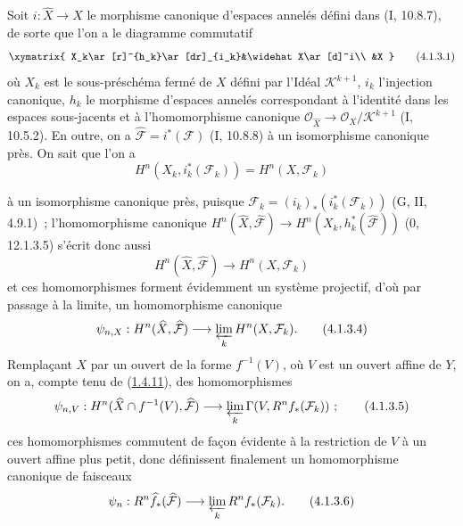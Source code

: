 \begin{env}[4.1.3]
\label{III.4.1.3-fr}
Soit $i:\widehat X\to X$ le morphisme canonique d'espaces annelés défini
dans (I, 10.8.7), de sorte que l'on a le diagramme commutatif
\[
\xymatrix{
X_k\ar[r]^{h_k}\ar[dr]_{i_k}&\widehat X\ar[d]^i\\
&X
}
\tag{4.1.3.1}\label{III.4.1.3.1-fr}
\]
où $X_k$ est le sous-préschéma fermé de $X$ défini par l'Idéal
$\mathcal K^{k+1}$, $i_k$ l'injection canonique, $h_k$ le morphisme
d'espaces annelés correspondant à l'identité dans les espaces sous-jacents
et à l'homomorphisme canonique
$\mathcal O_{\widehat X}\to\mathcal O_X/\mathcal K^{k+1}$ (I, 10.5.2).
En outre, on a $\widehat{\mathcal F}=i^*(\mathcal F)$ (I, 10.8.8) à un
isomorphisme canonique près. On sait que l'on a
\[
H^n(X_k,i_k^*(\mathcal F_k))=H^n(X,\mathcal F_k)
\tag{4.1.3.2}\label{III.4.1.3.2-fr}
\]


à un isomorphisme canonique près, puisque
$\mathcal F_k=(i_k)_*(i_k^*(\mathcal F_k))$ (G, II, 4.9.1)~;
l'homomorphisme canonique
$H^n(\widehat X,\widehat{\mathcal F})\to
H^n(X_k,h_k^*(\widehat{\mathcal F}))$ (0, 12.1.3.5) s'écrit donc aussi
\[
H^n(\widehat X,\widehat{\mathcal F})\longrightarrow H^n(X,\mathcal F_k)
\tag{4.1.3.3}\label{III.4.1.3.3-fr}
\]
et ces homomorphismes forment évidemment un système projectif, d'où par
passage à la limite, un homomorphisme canonique
\[
\psi_{n,X}:H^n(\widehat X,\widehat{\mathcal F})
\longrightarrow\varprojlim_kH^n(X,\mathcal F_k).
\tag{4.1.3.4}\label{III.4.1.3.4-fr}
\]
Remplaçant $X$ par un ouvert de la forme $f^{-1}(V)$, où $V$ est un
ouvert affine de $Y$, on a, compte tenu de
(\hyperref[III.1.4.11-fr]{1.4.11}), des homomorphismes
\[
\psi_{n,V}:H^n(\widehat X\cap f^{-1}(V),\widehat{\mathcal F})
\longrightarrow\varprojlim_k\Gamma(V,R^nf_*(\mathcal F_k))~;
\tag{4.1.3.5}\label{III.4.1.3.5-fr}
\]
ces homomorphismes commutent de façon évidente à la restriction de $V$ à
un ouvert affine plus petit, donc définissent finalement un homomorphisme
canonique de faisceaux
\[
\psi_n:R^n\widehat f_*(\widehat{\mathcal F})
\longrightarrow\varprojlim_kR^nf_*(\mathcal F_k).
\tag{4.1.3.6}\label{III.4.1.3.6-fr}
\]
\end{env}

